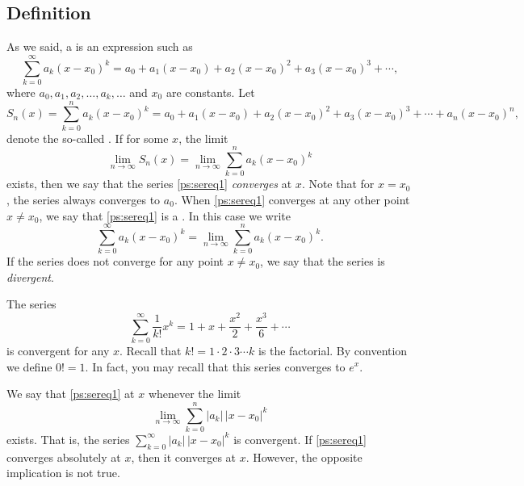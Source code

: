 \documentclass[12pt]{book}
\begin{document}
\subsection{Definition}

As we said, a \emph{} is an expression such as
\begin{equation} \label{ps:sereq1}
\sum_{k=0}^\infty a_k {(x-x_0)}^k =
a_0 + 
a_1 (x-x_0) +
a_2 {(x-x_0)}^2 +
a_3 {(x-x_0)}^3 + \cdots,
\end{equation}
where $a_0,a_1,a_2,\ldots,a_k,\ldots$ and $x_0$ are constants.  Let
\begin{equation*}
S_n(x) = \sum_{k=0}^n a_k {(x-x_0)}^k =
a_0 + a_1 (x-x_0) + a_2 {(x-x_0)}^2 + a_3 {(x-x_0)}^3 + \cdots + a_n {(x-x_0)}^n ,
\end{equation*}
denote the so-called \emph{}.  If for some $x$,
the limit
\begin{equation*}
\lim_{n\to \infty} S_n(x) = \lim_{n\to\infty} \sum_{k=0}^n a_k {(x-x_0)}^k
\end{equation*}
exists, then we say that the series \eqref{ps:sereq1}
\emph{converges} at $x$.
Note that for $x=x_0$, the series always converges to $a_0$.
When \eqref{ps:sereq1}
converges at any other point $x \not= x_0$,
we say that \eqref{ps:sereq1} is a
\emph{}.  In this case we write
\begin{equation*}
\sum_{k=0}^\infty a_k {(x-x_0)}^k = 
\lim_{n\to\infty} \sum_{k=0}^n a_k {(x-x_0)}^k.
\end{equation*}
If the series does not converge for any point $x \not= x_0$, we say that
the series is \emph{divergent}.

\begin{example} \label{ps:expex}
The series
\begin{equation*}
\sum_{k=0}^\infty \frac{1}{k!} x^k = 
1 + x + \frac{x^2}{2} + \frac{x^3}{6} + \cdots
\end{equation*}
is convergent for any $x$.
Recall that $k! = 1\cdot 2\cdot 3 \cdots k$ is the
factorial.  By convention we define $0! = 1$.
In fact, you may recall that this series
converges to $e^x$.
\end{example}

We say that \eqref{ps:sereq1}
\emph{}
at $x$ whenever the limit
\begin{equation*}
\lim_{n\to\infty} \sum_{k=0}^n
\lvert a_k \rvert \, {\lvert x-x_0 \rvert}^k 
\end{equation*}
exists.  That is, the series
$\sum_{k=0}^\infty \lvert a_k \rvert \, {\lvert x-x_0 \rvert}^k$
is convergent.
If \eqref{ps:sereq1} converges absolutely at $x$, then it
converges at $x$.  However, the opposite implication is not true.
\end{document}
